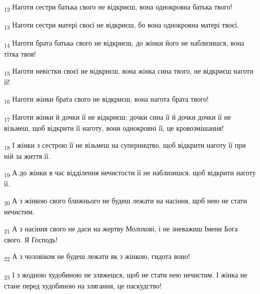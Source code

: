 \begin{tcolorbox}
\textsubscript{12} Наготи сестри батька свого не відкриєш, вона однокровна батька твого!
\end{tcolorbox}
\begin{tcolorbox}
\textsubscript{13} Наготи сестри матері своєї не відкриєш, бо вона однокровна матері твоєї.
\end{tcolorbox}
\begin{tcolorbox}
\textsubscript{14} Наготи брата батька свого не відкриєш, до жінки його не наблизишся, вона тітка твоя!
\end{tcolorbox}
\begin{tcolorbox}
\textsubscript{15} Наготи невістки своєї не відкриєш, вона жінка сина твого, не відкриєш наготи її!
\end{tcolorbox}
\begin{tcolorbox}
\textsubscript{16} Наготи жінки брата свого не відкриєш, вона нагота брата твого!
\end{tcolorbox}
\begin{tcolorbox}
\textsubscript{17} Наготи жінки й дочки її не відкриєш; дочки сина її й дочки дочки її не візьмеш, щоб відкрити її наготу, вони однокровні її, це кровозмішання!
\end{tcolorbox}
\begin{tcolorbox}
\textsubscript{18} І жінки з сестрою її не візьмеш на суперництво, щоб відкрити наготу її при ній за життя її.
\end{tcolorbox}
\begin{tcolorbox}
\textsubscript{19} А до жінки в час відділення нечистости її не наблизишся, щоб відкрити наготу її.
\end{tcolorbox}
\begin{tcolorbox}
\textsubscript{20} А з жінкою свого ближнього не будеш лежати на насіння, щоб нею не стати нечистим.
\end{tcolorbox}
\begin{tcolorbox}
\textsubscript{21} А з насіння свого не даси на жертву Молохові, і не зневажиш Імени Бога свого. Я Господь!
\end{tcolorbox}
\begin{tcolorbox}
\textsubscript{22} А з чоловіком не будеш лежати як з жінкою, гидота воно!
\end{tcolorbox}
\begin{tcolorbox}
\textsubscript{23} І з жодною худобиною не зляжешся, щоб не стати нею нечистим. І жінка не стане перед худобиною на злягання, це паскудство!
\end{tcolorbox}
